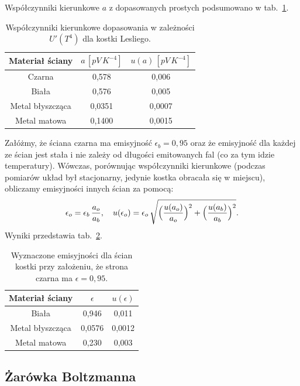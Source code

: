 \documentclass[12pt]{article}
\begin{document}
Współczynniki kierunkowe $a$ z dopasowanych prostych podsumowano w tab.~\ref{tab:cube_line}.

\begin{table}[H]
	\centering
	\begin{tabular}{c|cc}
		\toprule
		Materiał ściany & $a\,[pV\,K^{-4}]$ & $u(a)\,[pV\,K^{-4}]$ \\
		\midrule
		Czarna           & 0{,}578  & 0{,}006 \\
		Biała            & 0{,}576  & 0{,}005 \\
		Metal błyszcząca & 0{,}0351 & 0{,}0007 \\
		Metal matowa     & 0{,}1400 & 0{,}0015 \\
		\bottomrule
	\end{tabular}
	\caption{Współczynniki kierunkowe dopasowania w zależności $U'(T^4)$ dla kostki Lesliego.}
	\label{tab:cube_line}
\end{table}

Załóżmy, że ściana czarna ma emisyjność $\epsilon_b=0{,}95$ oraz że emisyjność dla każdej ze ścian jest stała i nie zależy od długości emitowanych fal (co za tym idzie temperatury). Wówczas, porównując współczynniki kierunkowe (podczas pomiarów układ był stacjonarny, jedynie kostka obracała się w miejscu), obliczamy emisyjności innych ścian za pomocą:
\begin{equation}
	\epsilon_o = \epsilon_b\,\frac{a_o}{a_b}, 
	\quad
	u(\epsilon_o) = \epsilon_o\,\sqrt{\Bigl(\frac{u(a_o)}{a_o}\Bigr)^2 + \Bigl(\frac{u(a_b)}{a_b}\Bigr)^2}.
	\label{eq:epsilon_ratio}
\end{equation}
Wyniki przedstawia tab.~\ref{tab:materials_emisity}.

\begin{table}[H]
	\centering
	\begin{tabular}{c|cc}
		\toprule
		Materiał ściany & $\epsilon$ & $u(\epsilon)$ \\
		\midrule
		Biała            & 0{,}946    & 0{,}011 \\
		Metal błyszcząca & 0{,}0576   & 0{,}0012 \\
		Metal matowa     & 0{,}230    & 0{,}003 \\
		\bottomrule
	\end{tabular}
	\caption{Wyznaczone emisyjności dla ścian kostki przy założeniu, że strona czarna ma $\epsilon=0{,}95$.}
	\label{tab:materials_emisity}
\end{table}

\subsection{Żarówka Boltzmanna}
\end{document}
